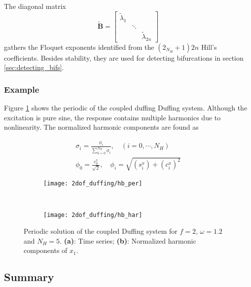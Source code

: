 The diagonal matrix
\begin{equation}
  \label{eq:hb_B_tilde}
  \tilde{\bm B} =
  \begin{bmatrix}
    \tilde \lambda_1 \\
    & \ddots \\
    & & \tilde \lambda_{2n}
  \end{bmatrix}
\end{equation}
gathers the Floquet exponents identified from the $(2_{N_H} + 1)2n$ Hill's
coefficients. Besides stability, they are used for detecting bifurcations in
section \ref{sec:detecting_bifs}.

\subsubsection{Example}
\label{sec:hb_example}

Figure \ref{fig:hb_duffing_periodic} shows the periodic of the coupled duffing
Duffing system. Although the excitation is pure sine, the response contains
multiple harmonics due to nonlinearity. The normalized harmonic components are
found as

\begin{equation}
  \label{eq:hb_normal_coeff}
  \begin{aligned}
    \sigma_i = \frac{\phi_i}{\sum_{k=0}^{N_H} \phi_i}, \quad (i=0,\cdots, N_H) \\
    \phi_0 = \frac{c_0^x}{\sqrt{2}}, \quad \phi_i = \sqrt{(s^x_i) + (c^x_i)^2}
  \end{aligned}
\end{equation}

\begin{figure}[!ht]
  \centering
  \begin{subfigure}[b]{0.6\textwidth}
    \texttt{[image: 2dof\_duffing/hb\_per]}
    \caption{}
  \end{subfigure}
  ~
  \begin{subfigure}[b]{0.36\textwidth}
    \texttt{[image: 2dof\_duffing/hb\_har]}
    \caption{}
  \end{subfigure}
    \caption{Periodic solution of the coupled Duffing system for $f=2$,
    $\omega=1.2$ and $N_H=5$.
    \textbf{(a)}: Time series;
    \textbf{(b)}: Normalized harmonic components of $x_1$.}
  \label{fig:hb_duffing_periodic}
\end{figure}
\FloatBarrier

\subsection{Summary}
\label{sec:per_summary}

